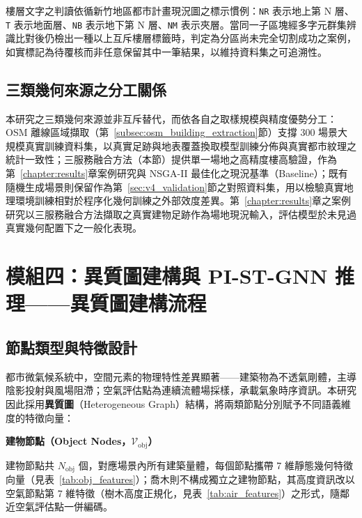 樓層文字之判讀依循新竹地區都市計畫現況圖之標示慣例：\texttt{NR} 表示地上第 N 層、\texttt{T} 表示地面層、\texttt{NB} 表示地下第 N 層、\texttt{NM} 表示夾層。當同一子區塊經多字元群集辨識比對後仍檢出一種以上互斥樓層標籤時，判定為分區尚未完全切割成功之案例，如實標記為待覆核而非任意保留其中一筆結果，以維持資料集之可追溯性。


\subsection{三類幾何來源之分工關係}
\label{subsec:extraction_vs_parametric}

本研究之三類幾何來源並非互斥替代，而依各自之取樣規模與精度優勢分工：OSM 離線區域擷取（第~\ref{subsec:osm_building_extraction}節）支撐 300 場景大規模真實訓練資料集，以真實足跡與地表覆蓋換取模型訓練分佈與真實都市紋理之統計一致性；三服務融合方法（本節）提供單一場地之高精度樓高驗證，作為第~\ref{chapter:results}章案例研究與 NSGA-II 最佳化之現況基準（Baseline）；既有隨機生成場景則保留作為第~\ref{sec:v4_validation}節之對照資料集，用以檢驗真實地理環境訓練相對於程序化幾何訓練之外部效度差異。第~\ref{chapter:results}章之案例研究以三服務融合方法擷取之真實建物足跡作為場地現況輸入，評估模型於未見過真實幾何配置下之一般化表現。


\section{模組四：異質圖建構與 PI-ST-GNN 推理——異質圖建構流程}
\label{sec:graph_construction}

\subsection{節點類型與特徵設計}
\label{subsec:nodes}

都市微氣候系統中，空間元素的物理特性差異顯著——建築物為不透氣剛體，主導陰影投射與風場阻滯；空氣評估點為連續流體場採樣，承載氣象時序資訊。本研究因此採用\textbf{異質圖}（Heterogeneous Graph）結構，將兩類節點分別賦予不同語義維度的特徵向量：

\noindent\textbf{建物節點（Object Nodes，$\mathcal{V}_{\text{obj}}$）}

建物節點共 $N_{\text{obj}}$ 個，對應場景內所有建築量體，每個節點攜帶 7 維靜態幾何特徵向量（見表~\ref{tab:obj_features}）；喬木則不構成獨立之建物節點，其高度資訊改以空氣節點第 7 維特徵（樹木高度正規化，見表~\ref{tab:air_features}）之形式，隨鄰近空氣評估點一併編碼。

